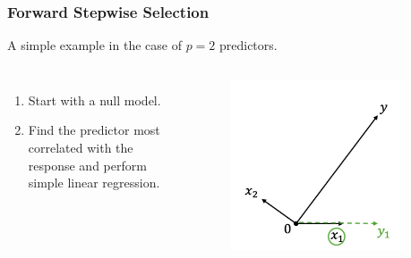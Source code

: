 \begin{frame}
\frametitle{Forward Stepwise Selection}
A simple example in the case of $p=2$ predictors.

\begin{columns}[t]
    \begin{enumerate}
        \item Start with a null model.
        \item Find the predictor most correlated with the response and perform simple linear regression.
    \end{enumerate}
    
    \begin{figure}[!htbp]
        \begin{center}
            \includegraphics[width=0.9\textwidth]{img/FStepR/2.jpeg}
        \end{center}
    \end{figure}
    \end{columns}
\end{frame}

